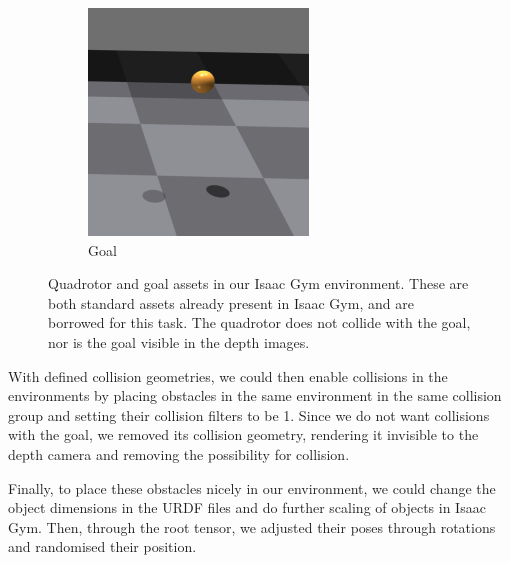 \begin{figure}[H]
     \begin{subfigure}[b]{0.32\textwidth}
         \centering
         \captionsetup{justification=centering}
         \includegraphics[width=\textwidth]{figures/6_/6_goal.png}
         \caption{Goal}
         \label{fig:6_goal}
     \end{subfigure} 
     \caption{Quadrotor and goal assets in our Isaac Gym environment. These are both standard assets already present in Isaac Gym, and are borrowed for this task. The quadrotor does not collide with the goal, nor is the goal visible in the depth images.}
     \label{fig:6_quad_goal}
\end{figure}

With defined collision geometries, we could then enable collisions in the environments by placing obstacles in the same environment in the same collision group and setting their collision filters to be 1. Since we do not want collisions with the goal, we removed its collision geometry, rendering it invisible to the depth camera and removing the possibility for collision. 

Finally, to place these obstacles nicely in our environment, we could change the object dimensions in the URDF files and do further scaling of objects in Isaac Gym. Then, through the root tensor, we adjusted their poses through rotations and randomised their position.

